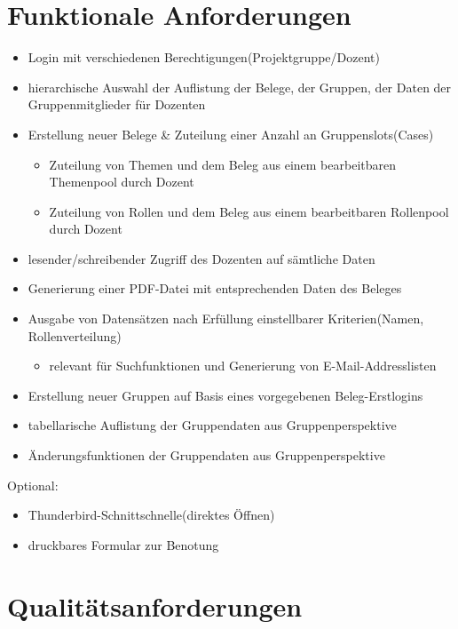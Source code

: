 \part{Funktionale Anforderungen}
\begin{itemize}
\item Login mit verschiedenen Berechtigungen(Projektgruppe/Dozent)
\item hierarchische Auswahl der Auflistung der Belege, der Gruppen, der Daten der Gruppenmitglieder für Dozenten
\item Erstellung neuer Belege & Zuteilung einer Anzahl an Gruppenslots(Cases)
\begin{itemize}
\item Zuteilung von Themen und dem Beleg aus einem bearbeitbaren Themenpool durch Dozent
\item Zuteilung von Rollen und dem Beleg aus einem bearbeitbaren Rollenpool durch Dozent
\end{itemize}
\item lesender/schreibender Zugriff des Dozenten auf sämtliche Daten
\item Generierung einer PDF-Datei mit entsprechenden Daten des Beleges
\item Ausgabe von Datensätzen nach Erfüllung einstellbarer Kriterien(Namen, Rollenverteilung)
\begin{itemize}
\item relevant für Suchfunktionen und Generierung von E-Mail-Addresslisten
\end{itemize}
\end{itemize}
\begin{itemize}
\item Erstellung neuer Gruppen auf Basis eines vorgegebenen Beleg-Erstlogins
\item tabellarische Auflistung der Gruppendaten aus Gruppenperspektive
\item Änderungsfunktionen der Gruppendaten aus Gruppenperspektive
\end{itemize}

Optional:
\begin{itemize}
\item Thunderbird-Schnittschnelle(direktes Öffnen)
\item druckbares Formular zur Benotung
\end{itemize}

\part{Qualitätsanforderungen}


